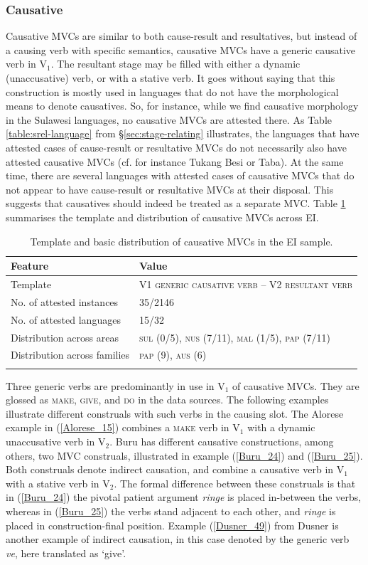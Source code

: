 \subsubsection{Causative}

Causative MVCs are similar to both cause-result and resultatives, but instead of a causing verb with specific semantics, causative MVCs have a generic causative verb in V$_1$. The resultant stage may be filled with either a dynamic (unaccusative) verb, or with a stative verb. It goes without saying that this construction is mostly used in languages that do not have the morphological means to denote causatives. So, for instance, while we find causative morphology in the Sulawesi languages, no causative MVCs are attested there. As Table \ref{table:srel-language} from §\ref{sec:stage-relating} illustrates, the languages that have attested cases of cause-result or resultative MVCs do not necessarily also have attested causative MVCs (cf. for instance Tukang Besi or Taba). At the same time, there are several languages with attested cases of causative MVCs that do not appear to have cause-result or resultative MVCs at their disposal. This suggests that causatives should indeed be treated as a separate MVC. Table \ref{table:causative} summarises the template and distribution of causative MVCs across EI.

\begin{table}
\begin{tabular}{ll}
\lsptoprule
Feature&Value\tabularnewline
\hline
Template&V1 \textsc{generic causative verb} -- V2 \textsc{resultant verb}\tabularnewline
No. of attested instances& 35/2146 \tabularnewline
No. of attested languages& 15/32 \tabularnewline
Distribution across areas& \textsc{sul} (0/5), \textsc{nus} (7/11), \textsc{mal} (1/5), \textsc{pap} (7/11) \tabularnewline
Distribution across families& \textsc{pap} (9), \textsc{aus} (6) \tabularnewline
\lspbottomrule
\end{tabular}
\caption[Template and basic distribution of causative MVCs]{Template and basic distribution of causative MVCs in the EI sample.}
\label{table:causative}
\end{table}

Three generic verbs are predominantly in use in V$_1$ of causative MVCs. They are glossed as \textsc{make}, \textsc{give}, and \textsc{do} in the data sources. The following examples illustrate different construals with such verbs in the causing slot. The Alorese example in (\ref{Alorese_15}) combines a \textsc{make} verb in V$_1$ with a dynamic unaccusative verb in V$_2$. Buru has different causative constructions, among others, two MVC construals, illustrated in example (\ref{Buru_24}) and (\ref{Buru_25}). Both construals denote indirect causation, and combine a causative verb in V$_1$ with a stative verb in V$_2$. The formal difference between these construals is that in (\ref{Buru_24}) the pivotal patient argument \textit{ringe} is placed in-between the verbs, whereas in (\ref{Buru_25}) the verbs stand adjacent to each other, and \textit{ringe} is placed in construction-final position. Example (\ref{Dusner_49}) from Dusner is another example of indirect causation, in this case denoted by the generic verb \textit{ve}, here translated as `give'. 

